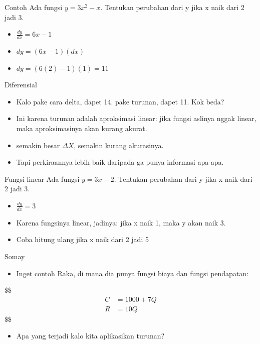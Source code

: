 \documentclass[
  ignorenonframetext,
]{beamer}
\providecommand{\tightlist}{%
  \setlength{\itemsep}{0pt}\setlength{\parskip}{0pt}}\usepackage{longtable,booktabs,array}
\begin{document}
\begin{frame}{Contoh}
\label{contoh-6}
Ada fungsi \(y=3x^2-x\). Tentukan perubahan dari y jika x naik dari 2
jadi 3.

\begin{itemize}[<+->]
\item
  \(\frac{dy}{dx}=6x-1\)
\item
  \(dy=(6x-1)(dx)\)
\item
  \(dy=(6(2)-1)(1)=11\)
\end{itemize}
\end{frame}

\begin{frame}{Diferensial}
\label{diferensial-1}
\begin{itemize}
\item
  Kalo pake cara delta, dapet 14. pake turunan, dapet 11. Kok beda?
\item
  Ini karena turunan adalah aproksimasi linear: jika fungsi aslinya
  nggak linear, maka aproksimasinya akan kurang akurat.
\item
  semakin besar \(\Delta X\), semakin kurang akurasinya.
\item
  Tapi perkiraannya lebih baik daripada ga punya informasi apa-apa.
\end{itemize}
\end{frame}

\begin{frame}{Fungsi linear}
\label{fungsi-linear-4}
Ada fungsi \(y=3x-2\). Tentukan perubahan dari y jika x naik dari 2 jadi
3.

\begin{itemize}[<+->]
\item
  \(\frac{dy}{dx}=3\)
\item
  Karena fungsinya linear, jadinya: jika x naik 1, maka y akan naik 3.
\item
  Coba hitung ulang jika x naik dari 2 jadi 5
\end{itemize}
\end{frame}

\begin{frame}{Somay}
\label{somay}
\begin{itemize}
\tightlist
\item
  Inget contoh Raka, di mana dia punya fungsi biaya dan fungsi
  pendapatan:
\end{itemize}

\$\$ \begin{align*}
C&=1000+7Q \\

R&=10Q

\end{align*} \$\$

\begin{itemize}
\tightlist
\item
  Apa yang terjadi kalo kita aplikasikan turunan?
\end{itemize}
\end{frame}
\end{document}
